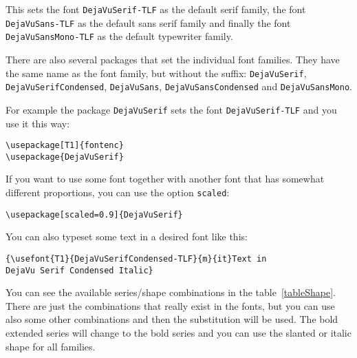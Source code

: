 \documentclass[oneside]{scrartcl}
\begin{document}
\sloppy
This sets the font \texttt{DejaVuSerif-TLF} as the default serif family,
the font \texttt{DejaVuSans-TLF} as the default sans serif family
and finally the
font \texttt{DejaVuSansMono-TLF} as the default typewriter family.

\sloppy
There are also several packages that set the individual font families.
They have the same name as the font family, but without the suffix:
\texttt{DejaVuSerif}, \texttt{DejaVuSerifCondensed},
\texttt{DejaVuSans}, \texttt{DejaVuSansCondensed} and \texttt{DejaVuSansMono}.

For example the package \texttt{DejaVuSerif} sets the font \texttt{DejaVuSerif-TLF}
and you use it this way:
\begin{verbatim}
\usepackage[T1]{fontenc}
\usepackage{DejaVuSerif}
\end{verbatim}

If you want to use some font together with another font that has somewhat
different proportions, you can use the option \texttt{scaled}:
\begin{verbatim}
\usepackage[scaled=0.9]{DejaVuSerif}
\end{verbatim}

You can also typeset some text in a desired font like this:
\begin{verbatim}
{\usefont{T1}{DejaVuSerifCondensed-TLF}{m}{it}Text in
DejaVu Serif Condensed Italic}
\end{verbatim}

You can see the available series/shape combinations in the
table~\ref{tableShape}. There are just the combinations that really
exist in the fonts, but you can use also some other combinations and
then the substitution will be used. The bold extended series
will change to the bold series and you can use the slanted or italic
shape for all families.

\begin{table}[!htb]
\end{table}
\end{document}
